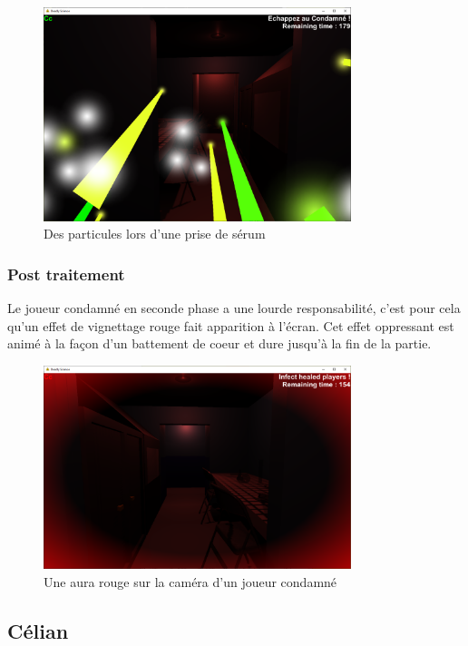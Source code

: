 \documentclass{article}
\begin{document}
\begin{figure}[H]
    \centering
    \includegraphics[width=0.8\textwidth]{cc/particles_example.png}
    \caption{Des particules lors d'une prise de sérum}
    \label{cc_c}
\end{figure}

\subsubsection{Post traitement}

Le joueur condamné en seconde phase a une lourde responsabilité, c'est pour cela qu'un effet de vignettage rouge fait apparition à l'écran.
Cet effet oppressant est animé à la façon d'un battement de coeur et dure jusqu'à la fin de la partie.

\begin{figure}[H]
    \centering
    \includegraphics[width=0.8\textwidth]{cc/post_proc.png}
    \caption{Une aura rouge sur la caméra d'un joueur condamné}
    \label{cc_d}
\end{figure}

\newpage
\subsection{Célian}
\end{document}

